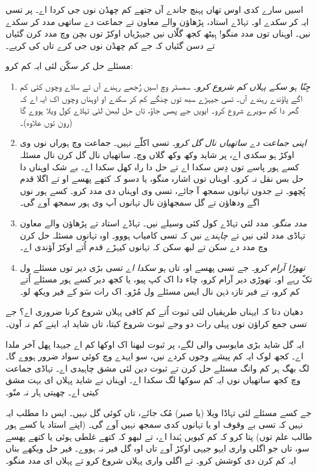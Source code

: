 \documentclass[../../../include/open-logic-section]{subfiles}
\begin{document}


اسیں سارے کدی اوس تھاں پہنچ جاندے آں جتھے کم چھڈن نوں جی کردا اے۔ پر تسی ایہ کر \emph{سکدے} او۔ تہاڈے استاد، پڑھاؤن والے معاون تے جماعت دے ساتھی مدد کر سکدے نیں۔ اوہناں توں مدد منگو!{} ہِیٹھ کجھ گلّاں نیں جیہڑیاں اوکڑ توں بچن وچ مدد کرن گئیاں تے دسن گئیاں کہ جے کم چھڈن نوں جی کرے تاں کی کریے۔

مسئلے حل کر سکّن لئی ایہ کم کرو:
\begin{enumerate}
\item \emph{جِنّا ہو سکے پہلاں کم شروع کرو۔} سمسٹر وچ اسیں رُجھے رہندے آں تے ساڈے وچوں کئی کم اگے پاؤندے رہندے آں۔ تسی جیہڑے سبھ توں چنگے کم کر سکدے او اوہناں وچوں اک ایہ اے کہ گھر دا کم سویرے شروع کرو۔ ایویں جے پھس جاؤ، تاں حل لبھن لئی تہاڈے کول ویلا ہووے گا (رون توں علاوہ)۔
\item \emph{اپنی جماعت دے ساتھیاں نال گل کرو}۔ تسی اکلّے نہیں۔ جماعت وچ ہوراں نوں وی اوکڑ ہو سکدی اے، پر شاید وکھ وکھ گلاں وچ۔ ساتھیاں نال گل کرن نال مسئلہ کسے ہور پاسے توں دِس سکدا اے تے حل دا راہ کھل سکدا اے۔ بے شک اوہناں دا حل بس نقل نہ کرو۔ اوہناں توں اشارہ منگو، یا دسو کہ کتھے پھسے او تے اگلا قدم پُچھو۔ تے جدوں تہانوں سمجھ آ جائے، تسی وی اوہناں دی مدد کرو۔ کسے ہور نوں اگے ودھاؤن تے گل سمجھاؤن نال تہانوں آپ وی ہور سمجھ آوے گی۔
\item \emph{مدد منگو۔} مدد لئی تہاڈے کول کئی وسیلے نیں۔ تہاڈے استاد تے پڑھاؤن والے معاون تہاڈی مدد لئی نیں تے \emph{چاہندے} نیں کہ تسی کامیاب ہووو۔ اوہ تہانوں مسئلہ حل کرن وچ مدد دے سکن تے لبھ سکن کہ تہانوں کیہڑے قدم اُتے اوکڑ آؤندی اے۔
\item \emph{تھوڑا آرام کرو۔} جے تسی پھسے او، تاں \emph{ہو سکدا اے} تسی بڑی دیر توں مسئلے ول تکّ رہے او۔ تھوڑی دیر آرام کرو، چاء دا اک کپ پیو، یا کجھ دیر کسے ہور مسئلے اُتے کم کرو، تے فیر تازہ ذہن نال ایس مسئلے ول مُڑو۔ اک رات سَو کے فیر ویکھ لو۔
\end{enumerate}

دھیان دتا کہ ایہناں طریقیاں لئی ثبوت اُتے کم کافی پہلاں شروع کرنا ضروری اے؟ جے تسی جمع کراؤن توں پہلی رات دو وجے ثبوت شروع کیتا، تاں شاید ایہ اینے کم نہ آون۔

ایہ گل شاید بڑی مایوسی والی لگے، پر ثبوت لبھنا اک اوکھا کم اے جیہدا پھل آخر ملدا اے۔ کجھ لوک ایہ کم پیشے وجوں کردے نیں، سو ایہدے وچ کوئی سواد ضرور ہووے گا۔ لگ بھگ ہر کم وانگ مسئلے حل کرن تے ثبوت دین لئی مشق چاہیدی اے۔ تہاڈی جماعت وچ کجھ ساتھیاں نوں ایہ کم سوکھا لگ سکدا اے۔ اوہناں نے شاید پہلاں ای بہت مشق کیتی اے۔ چھیتی ہار نہ منّو۔

جے کسے مسئلے لئی تہاڈا ویلا (یا صبر) مُک جائے، تاں کوئی گل نہیں۔ ایس دا مطلب ایہ نہیں کہ تسی بے وقوف او یا تہانوں کدی سمجھ نہیں آوے گی۔ (اپنے استاد یا کسے ہور طالب علم توں) پتا کرو کہ کم کیویں ہُندا اے، تے لبھو کہ کتھے غلطی ہوئی یا کتھے پھسے سو، تاں جو اگلی واری ایہو جیہی اوکڑ آوے تاں اوہ گل فیر نہ ہووے۔ فیر حل ویکھے بناں ایہ کم کرن دی کوشش کرو۔ تے اگلی واری پہلاں شروع کرو تے پہلاں ای مدد منگو۔
\end{document}
